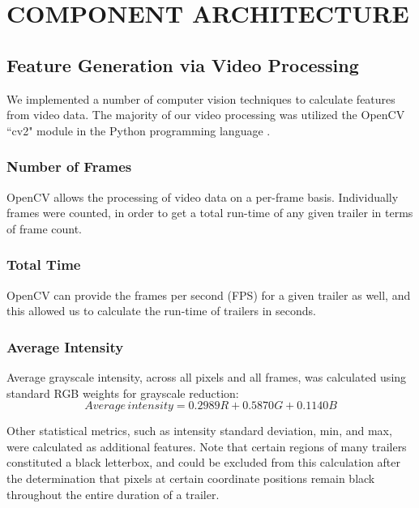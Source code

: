 \documentclass[letterpaper, 10 pt, conference]{ieeeconf}  %
\begin{document}
\section{COMPONENT ARCHITECTURE}

\subsection{Feature Generation via Video Processing}

We implemented a number of computer vision techniques to calculate features from video data. The majority of our video processing was utilized the OpenCV ``cv2" module in the Python programming language \cite{cv2}.

\subsubsection{Number of Frames}

OpenCV allows the processing of video data on a per-frame basis. Individually frames were counted, in order to get a total run-time of any given trailer in terms of frame count.

\subsubsection{Total Time}
OpenCV can provide the frames per second (FPS) for a given trailer as well, and this allowed us to calculate the run-time of trailers in seconds.

\subsubsection{Average Intensity}
Average grayscale intensity, across all pixels and all frames, was calculated using standard RGB weights for grayscale reduction:
\begin{equation*}
Average\,intensity= 0.2989R+0.5870G+0.1140B
\end{equation*}

Other statistical metrics, such as intensity standard deviation, min, and max, were calculated as additional features. Note that certain regions of many trailers constituted a black letterbox, and could be excluded from this calculation after the determination that pixels at certain coordinate positions remain black throughout the entire duration of a trailer.
\end{document}
